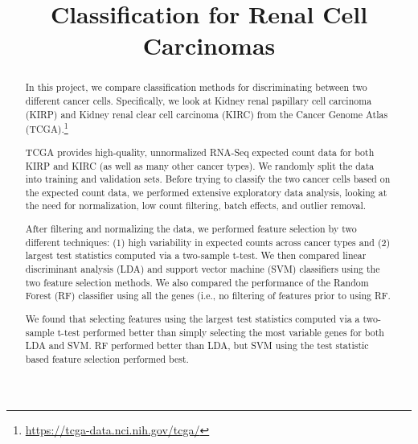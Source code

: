 



\begin{frontmatter}

\title{Classification for Renal Cell Carcinomas}



\begin{abstract}

In this project, we compare classification methods for discriminating between
two different cancer cells. Specifically, we look at Kidney renal
papillary cell carcinoma (KIRP) and Kidney renal clear cell carcinoma (KIRC)
from the Cancer Genome Atlas (TCGA).\footnote{\url{https://tcga-data.nci.nih.gov/tcga/}}

TCGA provides high-quality, unnormalized RNA-Seq expected count data for both
KIRP and KIRC (as well as many other cancer types).  We randomly split the data into
training and validation sets. Before trying to classify
the two cancer cells based on the expected count data, we performed extensive
exploratory data analysis, looking at the need for normalization, low
count filtering, batch effects, and outlier removal.

After filtering and normalizing the data, we performed feature selection by two
different techniques:  (1) high variability in expected counts across cancer
types and (2) largest test statistics computed via a two-sample t-test.  We then
compared linear discriminant analysis (LDA) and support vector machine (SVM)
classifiers using the two feature selection methods.  We also compared the
performance of the Random Forest (RF) classifier using all the genes (i.e., no
filtering of features prior to using RF.

We found that selecting features using the largest test statistics computed via
a two-sample t-test performed better than simply selecting the most variable
genes for both LDA and SVM.  RF performed better than LDA, but SVM using
the test statistic based feature selection performed best.

\end{abstract}

\begin{keyword}
\end{keyword}

\end{frontmatter}



